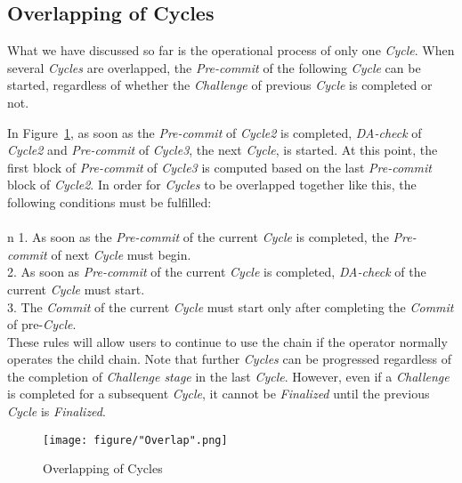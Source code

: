 \documentclass[letterpaper, 11pt]{article}
\begin{document}
\subsection{Overlapping of Cycles} \label{subsec:overlap}
\begin{CJK}{UTF8}{mj}
What we have discussed so far is the operational process of only one \emph{Cycle}. When several \emph{Cycles} are overlapped, the \emph{Pre-commit} of the following \emph{Cycle} can be started, regardless of whether the \emph{Challenge} of previous \emph{Cycle} is completed or not.

In Figure~\ref{fig:overlap-of-cycle}, as soon as the \emph{Pre-commit} of \emph{Cycle2} is completed, \emph{DA-check} of \emph{Cycle2} and \emph{Pre-commit} of \emph{Cycle3}, the next \emph{Cycle}, is started. At this point, the first block of \emph{Pre-commit} of \emph{Cycle3} is computed based on the last \emph{Pre-commit} block of \emph{Cycle2}. In order for \emph{Cycles} to be overlapped together like this, the following conditions must be fulfilled: \\
\\n
1. As soon as the \emph{Pre-commit} of the current \emph{Cycle} is completed, the \emph{Pre-commit} of next \emph{Cycle} must begin. \\
2. As soon as \emph{Pre-commit} of the current \emph{Cycle} is completed, \emph{DA-check} of the current \emph{Cycle} must start. \\
3. The \emph{Commit} of the current \emph{Cycle} must start only after completing the \emph{Commit} of pre-\emph{Cycle}. \\

These rules will allow users to continue to use the chain if the operator normally operates the child chain. Note that further \emph{Cycles} can be progressed regardless of the completion of \emph{Challenge stage} in the last \emph{Cycle}. However, even if a \emph{Challenge} is completed for a subsequent \emph{Cycle}, it cannot be \emph{Finalized} until the previous \emph{Cycle} is \emph{Finalized}.
\end{CJK}

\begin{figure}[!h]
\centering
\texttt{[image: figure/"Overlap".png]}
\caption{Overlapping of Cycles}
\label{fig:overlap-of-cycle}
\end{figure}
\end{document}
